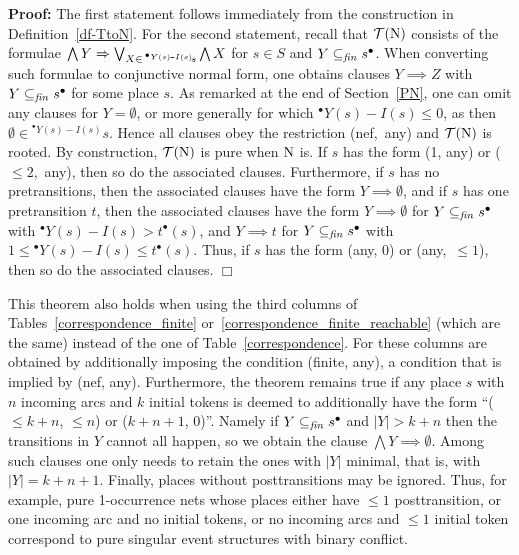 \documentclass[twocolumn]{article}
\newenvironment{proof}{\begin{trivlist} \item[\hspace{\labelsep}\bf
Proof:]}{\hfill $\Box$\end{trivlist}}
\newcommand{\df}[1]{Definition~\ref{df-#1}}
\begin{document}
\begin{proof}
The first statement follows immediately from the construction in \df{TtoN}.
For the second statement, recall that ${\cal T}({\rm N})$ consists of the formulae
$\bigwedge Y\Rightarrow\bigvee_{X\in\,^{^\bullet Y(s)\raisebox{-1pt}{-}I(s)}\!s} \bigwedge X$
for $s\in S$ and $Y \subseteq_{\it fin} s^\bullet$. When converting such
formulae to conjunctive normal form, one obtains clauses $Y \implies Z$
with $Y \subseteq_{\it fin} s^\bullet$ for some place $s$. 
As remarked at the end of Section~\ref*{PN},
one can omit any clauses for $Y=\emptyset$, or more generally for
which $^\bullet Y(s){-}I(s) \leq 0$,
as then $\emptyset \mathbin\in \mathord{^{^\bullet Y(s){-}I(s)}\!s}$.
Hence all clauses obey the restriction
\mbox{(nef, any)} and ${\cal T}({\rm N})$ is rooted. By construction, ${\cal T}({\rm N})$ is
pure when ${\rm N}$ is.  If $s$ has the form (1, any) or \mbox{($\leq\!2$, any)}, then so do the associated clauses.  Furthermore, if
$s$ has no pretransitions, then the associated clauses
have the form $Y\implies\emptyset$, and if $s$ has one pretransition
$t$, then the associated clauses have the form $Y\implies\emptyset$
for $Y\subseteq_{\it fin} s^\bullet$ with 
$^\bullet Y(s)- I(s)>t^\bullet(s)$, 
and $Y\implies t$ for $Y\subseteq_{\it fin} s^\bullet$ with
$1 \leq {^\bullet Y(s)- I(s)} \leq t^\bullet(s)$. Thus, if $s$ has the form
(any, 0) or \mbox{(any, $\leq\!1$)}, then so do the associated clauses.
\end{proof}
This theorem also holds when using the third columns of
Tables~\ref{correspondence_finite} or~\ref{correspondence_finite_reachable}
(which are the same) instead of the one of Table~\ref{correspondence}.
For these columns are obtained by additionally imposing the condition
(finite, any), a condition that is implied by (nef, any). Furthermore,
the theorem remains true if any place $s$ with $n$ incoming arcs and $k$
initial tokens is deemed to additionally have the form
``($\leq\! k\!+\!n$, $\leq\!n$) or ($k\!+\!n\!+\!1$, 0)''.
Namely if $Y \subseteq_{\it fin} s^\bullet$ and $|Y|>k+n$ then the
transitions in $Y$ cannot all happen, so we obtain the clause $\bigwedge
Y \implies \emptyset$. Among such clauses one only needs to retain the
ones with $|Y|$ minimal, that is, with $|Y|=k+n+1$.
Finally, places without posttransitions may be ignored.\linebreak
Thus, for example, pure 1-occurrence nets whose places either have
$\leq\!1$ posttransition, or one incoming arc and no initial
tokens, or no incoming arcs and $\leq\!1$ initial token correspond to
pure singular event structures with binary conflict.
\end{document}
